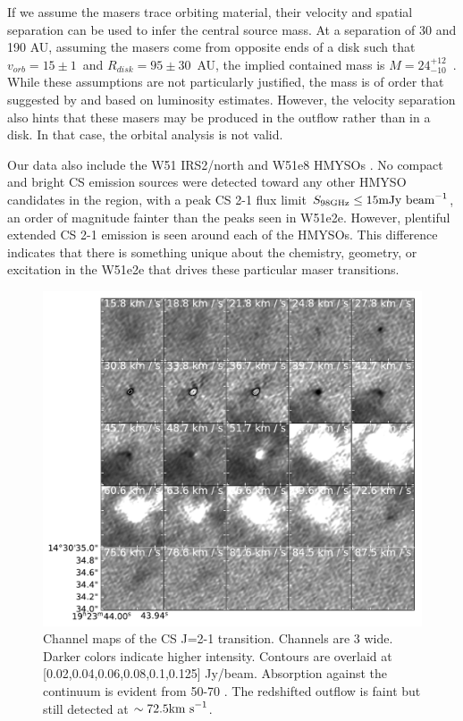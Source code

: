 \documentclass[twocolumn]{aastex62}
\begin{document}
If we assume the masers trace orbiting material, their velocity and spatial
separation can be used to infer the central source mass.  At a separation of 30
\kms and 190 AU, assuming the masers come from opposite ends of a disk such
that $v_{orb}=15\pm1$~\kms and $R_{disk}=95\pm30$~AU, the implied contained mass is
$M=24_{-10}^{+12}$~\msun.  While these assumptions are not particularly
justified, the mass is of order that suggested by \citet{Ginsburg2017a} and
\citet{Goddi2018a} based on luminosity estimates.
However, the velocity separation also hints that these masers may be produced
in the outflow rather than in a disk.  In that case, the orbital analysis
is not valid.


Our data also include the W51 IRS2/north and W51e8 HMYSOs
\citep{Ginsburg2017a}.  No compact and bright CS emission sources were detected
toward any other HMYSO candidates in the region, with a peak CS 2-1 flux limit
${S_{98 \mathrm{GHz}} \leq 15 \mathrm{mJy~\textrm{beam}^{-1}}}$, an order of magnitude
fainter than the peaks seen in W51e2e.  However, plentiful extended CS 2-1
emission is seen around each of the HMYSOs.  This difference indicates that
there is something unique about the chemistry, geometry, or excitation in the
W51e2e that drives these particular maser transitions.


\begin{figure}
    \includegraphics[]{figures/CS_maser_channel_maps.pdf}
    \caption{Channel maps of the CS J=2-1 transition.  Channels are 3 \kms
    wide.  Darker colors indicate higher intensity.  Contours are overlaid at
    [0.02,0.04,0.06,0.08,0.1,0.125] Jy/beam.  Absorption against the continuum
    is evident from 50-70 \kms.  The redshifted outflow is faint but still
    detected at
    $\sim72.5\textrm{km~s}^{-1}$.
    }
    \label{fig:channelmaps}
\end{figure}
\end{document}
